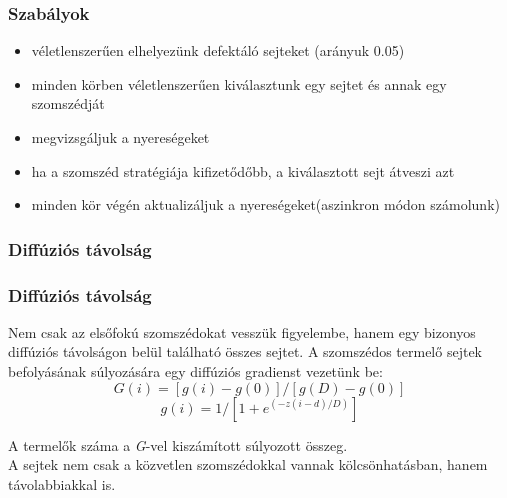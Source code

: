 \begin{frame}
	\frametitle{Szabályok}
	\begin{itemize}
		\item véletlenszerűen elhelyezünk defektáló sejteket (arányuk 0.05)
		\item minden körben véletlenszerűen kiválasztunk egy sejtet és annak egy szomszédját 
		\item megvizsgáljuk a nyereségeket
		\item ha a szomszéd stratégiája kifizetődőbb, a kiválasztott sejt átveszi azt
		\item minden kör végén aktualizáljuk a nyereségeket(aszinkron módon számolunk)
	\end{itemize}
\end{frame}

\subsubsection{Diffúziós távolság}
\begin{frame}
	\frametitle{Diffúziós távolság}
	\begin{block}{}
		Nem csak az elsőfokú szomszédokat vesszük figyelembe, hanem egy bizonyos diffúziós távolságon belül található összes sejtet. A szomszédos termelő sejtek befolyásának súlyozására egy diffúziós gradienst vezetünk be:
		\begin{equation}
			G(i) = [g(i) - g(0)]/[g(D) - g(0)] 
		\end{equation}
		\begin{equation}
			\label{eq:diffGradient}
			g(i) = 1/[1 + e^{(-z(i-d)/D)}]
		\end{equation}
	\end{block}
	\begin{block}{}
		A termelők száma a \textit{G}-vel kiszámított súlyozott összeg.\\
		A sejtek nem csak a közvetlen szomszédokkal vannak kölcsönhatásban, hanem távolabbiakkal is.
	\end{block}
\end{frame}

